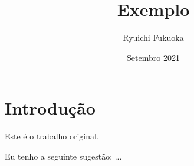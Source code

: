 \documentclass{article}
\title{Exemplo}
\author{Ryuichi Fukuoka}
\date{Setembro 2021}
\begin{document}
\maketitle

\section{Introdução}

\indent

Este é o trabalho original.

Eu tenho a seguinte sugestão: ...
\end{document}
